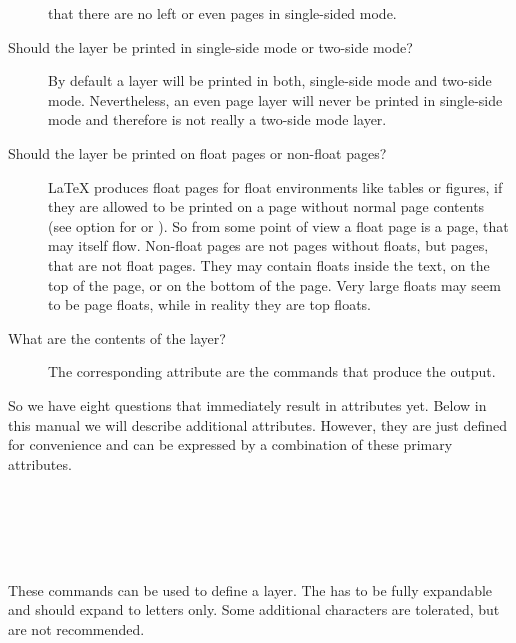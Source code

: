 \begin{description}
  that there are no left or even pages in single-sided mode.
\item[Should the layer be printed in single-side mode or two-side
  mode?\textnote{single-side or two-side}]%
  By default a layer will be printed in both, single-side mode and two-side
  mode. Nevertheless, an even page layer will never be printed in single-side
  mode and therefore is not really a two-side mode layer.
\item[Should the layer be printed on float pages or non-float
  pages?\textnote{float page or non-float page}]%
  \LaTeX{} produces float pages for float environments like tables or figures,
  if they are allowed to be printed on a page without normal page contents
  (see option  for  or ). So
  from some point of view a float page is a page, that may itself
  flow. Non-float pages are not pages without floats, but pages, that are not
  float pages. They may contain floats inside the text, on the top of the
  page, or on the bottom of the page. Very large floats may seem to be page
  floats, while in reality they are top floats.
\item[What are the contents of the layer?\textnote{contents}]%
  The corresponding attribute are the commands that produce the output.
\end{description}
So we have eight questions that immediately result in attributes yet. Below in
this manual we will describe additional attributes. However, they are just
defined for convenience and can be expressed by a combination of these primary
attributes.


\begin{Declaration}
  \\
  \\
  \\
  \\
\end{Declaration}
%
%
%
%
%
These commands can be used to define a layer. The  has to be
fully expandable and should expand to letters only. Some additional characters
are tolerated, but are not recommended.

